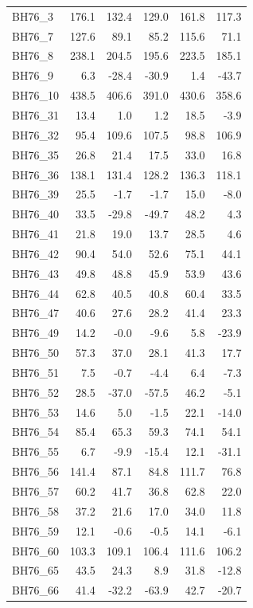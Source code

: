 \begin{longtable}{lrrrrr}
BH76\_3 & 176.1 & 132.4 & 129.0 & 161.8 & 117.3 \\
BH76\_7 & 127.6 & 89.1 & 85.2 & 115.6 & 71.1 \\
BH76\_8 & 238.1 & 204.5 & 195.6 & 223.5 & 185.1 \\
BH76\_9 & 6.3 & -28.4 & -30.9 & 1.4 & -43.7 \\
BH76\_10 & 438.5 & 406.6 & 391.0 & 430.6 & 358.6 \\
BH76\_31 & 13.4 & 1.0 & 1.2 & 18.5 & -3.9 \\
BH76\_32 & 95.4 & 109.6 & 107.5 & 98.8 & 106.9 \\
BH76\_35 & 26.8 & 21.4 & 17.5 & 33.0 & 16.8 \\
BH76\_36 & 138.1 & 131.4 & 128.2 & 136.3 & 118.1 \\
BH76\_39 & 25.5 & -1.7 & -1.7 & 15.0 & -8.0 \\
BH76\_40 & 33.5 & -29.8 & -49.7 & 48.2 & 4.3 \\
BH76\_41 & 21.8 & 19.0 & 13.7 & 28.5 & 4.6 \\
BH76\_42 & 90.4 & 54.0 & 52.6 & 75.1 & 44.1 \\
BH76\_43 & 49.8 & 48.8 & 45.9 & 53.9 & 43.6 \\
BH76\_44 & 62.8 & 40.5 & 40.8 & 60.4 & 33.5 \\
BH76\_47 & 40.6 & 27.6 & 28.2 & 41.4 & 23.3 \\
BH76\_49 & 14.2 & -0.0 & -9.6 & 5.8 & -23.9 \\
BH76\_50 & 57.3 & 37.0 & 28.1 & 41.3 & 17.7 \\
BH76\_51 & 7.5 & -0.7 & -4.4 & 6.4 & -7.3 \\
BH76\_52 & 28.5 & -37.0 & -57.5 & 46.2 & -5.1 \\
BH76\_53 & 14.6 & 5.0 & -1.5 & 22.1 & -14.0 \\
BH76\_54 & 85.4 & 65.3 & 59.3 & 74.1 & 54.1 \\
BH76\_55 & 6.7 & -9.9 & -15.4 & 12.1 & -31.1 \\
BH76\_56 & 141.4 & 87.1 & 84.8 & 111.7 & 76.8 \\
BH76\_57 & 60.2 & 41.7 & 36.8 & 62.8 & 22.0 \\
BH76\_58 & 37.2 & 21.6 & 17.0 & 34.0 & 11.8 \\
BH76\_59 & 12.1 & -0.6 & -0.5 & 14.1 & -6.1 \\
BH76\_60 & 103.3 & 109.1 & 106.4 & 111.6 & 106.2 \\
BH76\_65 & 43.5 & 24.3 & 8.9 & 31.8 & -12.8 \\
BH76\_66 & 41.4 & -32.2 & -63.9 & 42.7 & -20.7 \\

\end{longtable}
